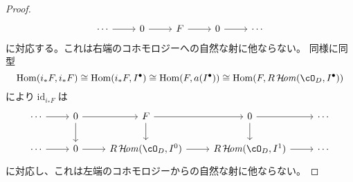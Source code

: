 \documentclass[uplatex, a4paper, dvipdfmx]{jsarticle}
\theoremstyle{definition}
\DeclareMathOperator{\Hom}{\mathrm{Hom}}
\DeclareMathOperator{\CHom}{\mathcal{H}\!\mathit{om}}
\DeclareMathOperator{\id}{\mathrm{id}}
\begin{document}
\begin{proof}
\[\begin{tikzcd}
            \cdots \ar[r] & 0 \ar[r]     & F \ar[r]     & 0\ar[r]& \cdots
        \end{tikzcd}
    \]
    に対応する。これは右端のコホモロジーへの自然な射に他ならない。
    同様に同型
    \begin{equation}
        \Hom(i_*F, i_*F) \cong \Hom(i_*F, I^\bullet) \cong \Hom(F, a(I^\bullet)) \cong \Hom(F, R\CHom(\cO_D, I^\bullet))
    \end{equation}
    により$\id_{i_*F}$は
    \[
        \begin{tikzcd}
            \cdots \ar[r] & 0 \ar[r]  \ar[d]    & F \ar[r]\ar[d]     & 0\ar[r]\ar[d]& \cdots\\
            \cdots \ar[r] & 0 \ar[r]  & R\CHom(\cO_D, I^0) \ar[r] & R\CHom(\cO_D, I^1)\ar[r]& \cdots
        \end{tikzcd}
    \]
    に対応し、これは左端のコホモロジーからの自然な射に他ならない。


\end{proof}
\end{document}
